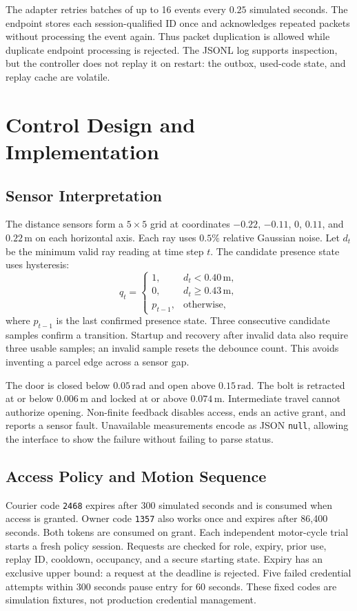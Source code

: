 \documentclass[conference,letterpaper]{IEEEtran}
\newcommand{\code}[1]{\texttt{\small #1}}
\begin{document}
The adapter retries batches of up to 16 events every $0.25$ simulated seconds. The endpoint stores each session-qualified ID once and acknowledges repeated packets without processing the event again. Thus packet duplication is allowed while duplicate endpoint processing is rejected. The JSONL log supports inspection, but the controller does not replay it on restart: the outbox, used-code state, and replay cache are volatile.

\section{Control Design and Implementation}
\label{sec:control}
\subsection{Sensor Interpretation}
The distance sensors form a $5\times5$ grid at coordinates $-0.22$, $-0.11$, $0$, $0.11$, and $0.22\,\mathrm{m}$ on each horizontal axis. Each ray uses $0.5\%$ relative Gaussian noise. Let $d_t$ be the minimum valid ray reading at time step $t$. The candidate presence state uses hysteresis:
\begin{equation}
q_t=\begin{cases}
1,&d_t<0.40\,\mathrm{m},\\
0,&d_t\geq0.43\,\mathrm{m},\\
p_{t-1},&\text{otherwise},
\end{cases}
\label{eq:presence}
\end{equation}
where $p_{t-1}$ is the last confirmed presence state. Three consecutive candidate samples confirm a transition. Startup and recovery after invalid data also require three usable samples; an invalid sample resets the debounce count. This avoids inventing a parcel edge across a sensor gap.

The door is closed below $0.05\,\mathrm{rad}$ and open above $0.15\,\mathrm{rad}$. The bolt is retracted at or below $0.006\,\mathrm{m}$ and locked at or above $0.074\,\mathrm{m}$. Intermediate travel cannot authorize opening. Non-finite feedback disables access, ends an active grant, and reports a sensor fault. Unavailable measurements encode as JSON \code{null}, allowing the interface to show the failure without failing to parse status.

\subsection{Access Policy and Motion Sequence}
Courier code \code{2468} expires after 300 simulated seconds and is consumed when access is granted. Owner code \code{1357} also works once and expires after 86,400 seconds. Both tokens are consumed on grant. Each independent motor-cycle trial starts a fresh policy session. Requests are checked for role, expiry, prior use, replay ID, cooldown, occupancy, and a secure starting state. Expiry has an exclusive upper bound: a request at the deadline is rejected. Five failed credential attempts within 300 seconds pause entry for 60 seconds. These fixed codes are simulation fixtures, not production credential management.
\end{document}
